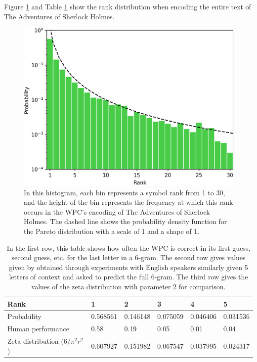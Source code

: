 Figure \ref{fig:predictor_surprisal_histogram} and Table \ref{tab:predictor_surprisal} show the rank distribution when encoding the entire text of The Adventures of Sherlock Holmes.

\begin{figure}[h]
\centering
\includegraphics[width=\textwidth]{img/predictor_surprisal_histogram.png}
\caption{In this histogram, each bin represents a symbol rank from 1 to 30, and the height of the bin represents the frequency at which this rank occurs in the WPC's encoding of The Adventures of Sherlock Holmes. The dashed line shows the probability density function for the Pareto distribution with a scale of 1 and a shape of 1.}
\label{fig:predictor_surprisal_histogram}
\end{figure}

\begin{table}[ht]
\centering
\begin{tabular}{ |p{4cm}||p{1.5cm}|p{1.5cm}|p{1.5cm}|p{1.5cm}|p{1.5cm}|  }
 \hline
    Rank & 1 & 2 & 3 & 4 & 5\\
 \hline
    Probability & 0.568561 & 0.146148 & 0.075059 & 0.046406 & 0.031536\\
 \hline
    Human performance & 0.58 & 0.19 & 0.05 & 0.01 & 0.04\\
 \hline
    Zeta distribution ($6/{{\pi^2}{r^2}}$) & 0.607927 & 0.151982 & 0.067547 & 0.037995 & 0.024317\\
 \hline
\end{tabular}
\caption{In the first row, this table shows how often the WPC is correct in its first guess, second guess, etc. for the last letter in a 6-gram. The second row gives values given by \textcite{Shannon1951} obtained through experiments with English speakers similarly given 5 letters of context and asked to predict the full 6-gram. The third row gives the values of the zeta distribution with parameter 2 for comparison.}
\label{tab:predictor_surprisal}
\end{table}


